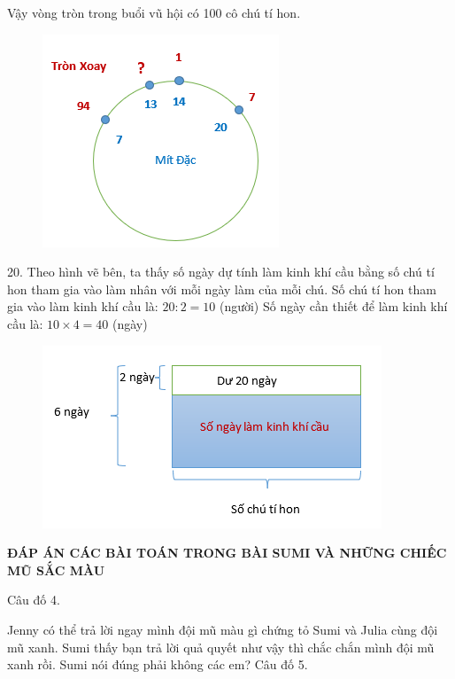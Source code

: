 \vskip 0.1cm
Vậy vòng tròn trong buổi vũ hội có 100 cô chú tí hon.
\begin{figure}[H]
	\centering
	\vspace*{-5pt}
	\captionsetup{labelformat= empty, justification=centering}
	\includegraphics[width=0.5\linewidth]{15}
	\vspace*{-15pt}
\end{figure}
20. Theo hình vẽ bên, ta thấy số ngày dự tính làm kinh khí cầu bằng số chú tí hon tham gia vào làm nhân với mỗi ngày làm của mỗi chú.
Số chú tí hon tham gia vào làm kinh khí cầu là: $20 : 2 = 10$ (người)
\vskip 0.1cm
Số ngày cần thiết để làm kinh khí cầu là: $10 \times 4 = 40$ (ngày)
\begin{figure}[H]
	\centering
	\vspace*{-5pt}
	\captionsetup{labelformat= empty, justification=centering}
	\includegraphics[width=0.5\linewidth]{16}
	\vspace*{-15pt}
\end{figure}
\newpage
\begin{center}
	{}
\end{center}
\begin{center}
	\textbf{ĐÁP ÁN CÁC BÀI TOÁN TRONG BÀI SUMI VÀ NHỮNG CHIẾC MŨ SẮC MÀU}
\end{center}
Câu đố 4. %

Jenny có thể trả lời ngay mình đội mũ màu gì chứng tỏ Sumi và Julia cùng đội mũ xanh. Sumi thấy bạn trả lời quả quyết như vậy thì chắc chắn mình đội mũ xanh rồi. Sumi nói đúng phải không các em?
\vskip 0.1cm
Câu đố 5. %

